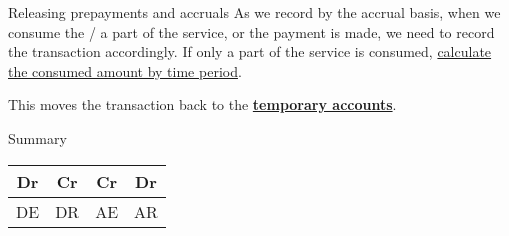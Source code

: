 \begin{theorem}
    {Releasing prepayments and accruals}
    As we record by the accrual basis, when we consume the / a part of the service, or the payment is made, we need to record the transaction accordingly. If only a part of the service is consumed, \underline{calculate the consumed amount by time period}.

    This moves the transaction back to the \hyperref[def:temp_perm]{\textbf{temporary accounts}}.
\end{theorem}
\label{thm:release}

\begin{knBox}
    {Summary}
    \begin{center}
        \begin{tabular}{c|c|c|c}
            Dr & Cr & Cr & Dr \\
            \hline
            DE & DR & AE & AR \\
        \end{tabular}


        \vspace{3em}
    \end{center}
\end{knBox}

